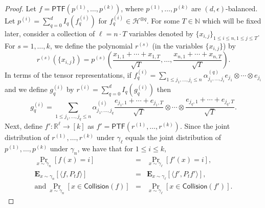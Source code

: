 \documentclass{toc}
\begin{document}
\begin{proof}
    Let $f = \mathsf{PTF}(p^{(1)}, \ldots, p^{(k)})$, where $p^{(1)}, \dots, p^{(k)}$ are $(d, \epsilon)$-balanced.
    Let $p^{(i)} = \sum_{q=0}^d I_q (f_q^{(i)})$ for $f_q^{(i)} \in \mathcal{H}^{\otimes q}$.
    For some $T \in \mathbb{N}$ which will be fixed later, consider a
    collection of $\ell = n \cdot T$ variables denoted by  $\{x_{i,j}\}_{1 \le
    i \le n, 1 \le j \le T}$.
    For $s = 1, \dots, k$, we define the polynomial $r^{(s)}$ (in the variables $\{x_{i,j}\}$) by
    \[
        r^{(s)}(\{x_{i,j}\}) = p^{(s)} \left(
            \frac{x_{1,1} + \cdots + x_{1,T}}{\sqrt T}, \dots, \frac{x_{n,1} + \cdots + x_{n,T}}{\sqrt T}
        \right).
    \]
    In terms of the tensor representations, if
    $f_q^{(i)} = \sum_{1 \le j_1, \ldots, j_i \le n} \alpha^{(q)}_{j_1, \ldots, j_i} e_{j_1} \otimes \cdots \otimes e_{j_i}$
    and we define $g^{(i)}_q$ by $r^{(i)} = \sum_{q=0}^d I_q(g^{(i)}_q)$ then
$$
g_{q}^{(i)}= \sum_{1 \le j_1, \ldots, j_q \le n} \alpha^{(i)}_{j_1, \ldots, j_q} \frac{e_{j_1,1} + \cdots + e_{j_1,T}}{\sqrt{T}} \otimes \cdots \otimes \frac{e_{j_q,1} + \cdots + e_{j_q,T}}{\sqrt{T}}. 
$$
Next, define $f' : \mathbb{R}^{\ell} \rightarrow [k]$ as $f'= \mathsf{PTF}(r^{(1)}, \ldots, r^{(k)})$. Since the joint distribution
of $r^{(1)}, \dots, r^{(k)}$ under $\gamma_\ell$ equals the joint distribution of $p^{(1)}, \dots, p^{(k)}$ under $\gamma_n$,
we have that for $1\le i \le k$,
\begin{eqnarray}
\Pr_{x \sim \gamma_n}[f(x)=i] &=&\Pr_{x \sim \gamma_\ell}[f'(x)=i], \nonumber \\ 
\mathbf{E}_{x \sim \gamma_n} [\langle f, P_t f \rangle]&=&\mathbf{E}_{x \sim \gamma_\ell} [\langle f', P_t f' \rangle], \nonumber \\
\textrm{and} \ \Pr_{x \sim \gamma_n} [x \in \mathsf{Collision}(f)] &=& \Pr_{x \sim \gamma_\ell} [x \in \mathsf{Collision}(f')]. \label{eq:equality} 
\end{eqnarray}


\end{proof}
\end{document}
